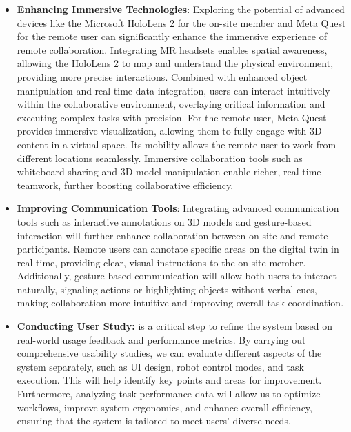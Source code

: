 \begin{itemize}
    \item \textbf{Enhancing Immersive Technologies}: Exploring the potential of advanced devices like the Microsoft HoloLens 2 for the on-site member and Meta Quest for the remote user can significantly enhance the immersive experience of remote collaboration. Integrating \ac{MR} headsets enables spatial awareness, allowing the HoloLens 2 to map and understand the physical environment, providing more precise interactions. Combined with enhanced object manipulation and real-time data integration, users can interact intuitively within the collaborative environment, overlaying critical information and executing complex tasks with precision. 
    For the remote user, Meta Quest provides immersive visualization, allowing them to fully engage with 3D content in a virtual space. Its mobility allows the remote user to work from different locations seamlessly. Immersive collaboration tools such as whiteboard sharing and 3D model manipulation enable richer, real-time teamwork, further boosting collaborative efficiency. 
    \item \textbf{Improving Communication Tools}: Integrating advanced communication tools such as interactive annotations on 3D models and gesture-based interaction will further enhance collaboration between on-site and remote participants. Remote users can annotate specific areas on the digital twin in real time, providing clear, visual instructions to the on-site member. Additionally, gesture-based communication will allow both users to interact naturally, signaling actions or highlighting objects without verbal cues, making collaboration more intuitive and improving overall task coordination.
    \item \textbf{Conducting User Study:} is a critical step to refine the system based on real-world usage feedback and performance metrics. By carrying out comprehensive usability studies, we can evaluate different aspects of the system separately, such as \ac{UI} design, robot control modes, and task execution. This will help identify key points and areas for improvement. Furthermore, analyzing task performance data will allow us to optimize workflows, improve system ergonomics, and enhance overall efficiency, ensuring that the system is tailored to meet users' diverse needs.

\end{itemize}
